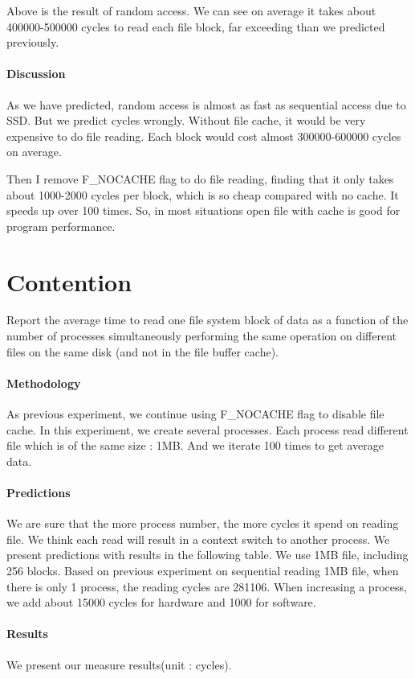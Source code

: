 Above is the result of random access. We can see on average it takes about 400000-500000 cycles to read each file block, far exceeding than we predicted previously.

\paragraph{Discussion}
As we have predicted, random access is almost as fast as sequential access due to SSD. But we predict cycles wrongly. Without file cache, it would be very expensive to do file reading. Each block would cost almost 300000-600000 cycles on average.

Then I remove F\_NOCACHE flag to do file reading, finding that it only takes about 1000-2000 cycles per block, which is so cheap compared with no cache. It speeds up over 100 times. So, in most situations open file with cache is good for program performance.

\section{Contention}
Report the average time to read one file system block of data as a function of the number of processes simultaneously performing the same operation on different files on the same disk (and not in the file buffer cache).

\paragraph{Methodology}
As previous experiment, we continue using F\_NOCACHE flag to disable file cache. In this experiment, we create several processes. Each process read different file which is of the same size : 1MB. And we iterate 100 times to get average data. 

\paragraph{Predictions}
We are sure that the more process number, the more cycles it spend on reading file. We think each read will result in a context switch to another process. We present predictions with results in the following table. We use 1MB file, including 256 blocks. Based on previous experiment on sequential reading 1MB file, when there is only 1 process, the reading cycles are 281106. When increasing a process, we add about 15000 cycles for hardware and 1000 for software.

\paragraph{Results}
We present our measure results(unit : cycles). 

